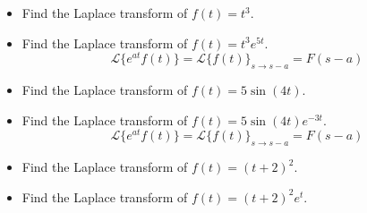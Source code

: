 \documentclass[11pt]{beamer}
\theoremstyle{plain}
\begin{document}
\begin{frame}
    \begin{example}
        \begin{itemize}[label=$\bullet$]
            \item Find the Laplace transform of $f(t)=t^3$.
            \item Find the Laplace transform of $f(t)=t^3 e^{5t}$.
            $$\boxed{\mathcal L\{e^{at}f(t)\}=\mathcal L\{f(t)\}_{s\rightarrow s-a}=F(s-a)}$$
        \end{itemize}
    \end{example}
    \begin{example}
        \begin{itemize}
            \item Find the Laplace transform of $f(t)=5\sin(4t)$.
            \item Find the Laplace transform of $f(t)=5\sin(4t) e^{-3t}$.
            $$\boxed{\mathcal L\{e^{at}f(t)\}=\mathcal L\{f(t)\}_{s\rightarrow s-a}=F(s-a)}$$
        \end{itemize}
    \end{example}
\end{frame}

\begin{frame}
    \begin{example}
        \begin{itemize}
            \item Find the Laplace transform of $f(t)=(t+2)^2$.
            \item Find the Laplace transform of $f(t)=(t+2)^2 e^t$.
        \end{itemize}
    \end{example}
\end{frame}
\end{document}
